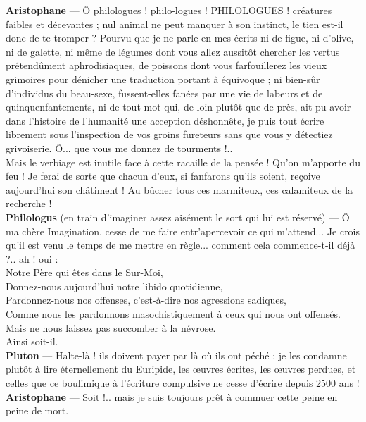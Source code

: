 \documentclass{book}%
\newcommand{\espace}[1]{\hspace{#1}}%
\newlength{\larg}%
\newcommand{\decalageN}[1]{%
\settowidth{\larg}{#1}%
\espace{-\larg}%
}
\newcommand{\perso}[1]{\decalageN{\textbf{#1} --- }\textbf{#1}}%
\begin{document}
\perso{Aristophane} — Ô philologues ! philo-logues ! PHILOLOGUES ! créatures faibles et décevantes ; nul animal ne peut manquer à son instinct, le tien est-il donc de te tromper ? Pourvu que je ne parle en mes écrits ni de figue, ni d'olive, ni de galette, ni même de légumes dont vous allez aussitôt chercher les vertus prétendûment aphrodisiaques, de poissons dont vous farfouillerez les vieux grimoires pour dénicher une traduction portant à équivoque ; ni bien-sûr d'individus du beau-sexe, fussent-elles fanées par une vie de labeurs et de quinquenfantements, ni de tout mot qui, de loin plutôt que de près, ait pu avoir dans l'histoire de l'humanité une acception déshonnête, je puis tout écrire librement sous l'inspection de vos groins fureteurs sans que vous y détectiez grivoiserie. Ô... que vous me donnez de tourments !.. \\
Mais le verbiage est inutile face à cette racaille de la pensée ! Qu'on m'apporte du feu ! Je ferai de sorte que chacun d'eux, si fanfarons qu'ils soient, reçoive aujourd'hui son châtiment ! Au bûcher tous ces marmiteux, ces calamiteux de la recherche ! \\

\perso{Philologus} (en train d'imaginer assez aisément le sort qui lui est réservé) — Ô ma chère Imagination, cesse de me faire entr'apercevoir ce qui m'attend... Je crois qu'il est venu le temps de me mettre en règle... comment cela commence-t-il déjà ?.. ah ! oui : \\
Notre Père qui êtes dans le Sur-Moi, \\
Donnez-nous aujourd'hui notre libido quotidienne, \\
Pardonnez-nous nos offenses, c'est-à-dire nos agressions sadiques, \\
Comme nous les pardonnons masochistiquement à ceux qui nous ont offensés. \\
Mais ne nous laissez pas succomber à la névrose. \\
Ainsi soit-il. \\

\perso{Pluton} — Halte-là ! ils doivent payer par là où ils ont péché : je les condamne plutôt à lire éternellement du Euripide, les œuvres écrites, les œuvres perdues, et celles que ce boulimique à l'écriture compulsive ne cesse d'écrire depuis 2500 ans ! \\

\perso{Aristophane} — Soit !.. mais je suis toujours prêt à commuer cette peine en peine de mort. \\
\end{document}
